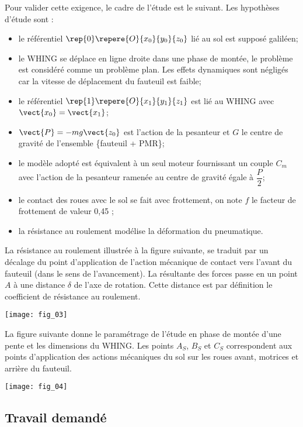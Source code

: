 Pour valider cette exigence, le cadre de l'étude est le suivant.
Les hypothèses d'étude sont :
\begin{itemize}
\item le référentiel $\rep{0}\repere{O}{x_0}{y_0}{z_0}$ lié au sol est supposé galiléen;
\item le WHING se déplace en ligne droite dans une phase de montée, le problème est considéré comme un problème plan. Les effets dynamiques sont négligés car la vitesse de déplacement du
fauteuil est faible;
\item le référentiel $\rep{1}\repere{O}{x_1}{y_1}{z_1}$ est lié au WHING avec $\vect{x_0}=\vect{x_1}$;
\item $\vect{P}=-mg\vect{z_0}$ est l'action de la pesanteur et $G$ le centre de gravité de l'ensemble \{fauteuil +
PMR\};
\item le modèle adopté est équivalent à un seul moteur fournissant un couple $C_m$ avec l'action de la
pesanteur ramenée au centre de gravité égale à $\dfrac{P}{2}$;
\item le contact des roues avec le sol se fait avec frottement, on note $f$ le facteur de frottement de valeur 0,45 ;
\item la résistance au roulement modélise la déformation du pneumatique.
\end{itemize}

La résistance au roulement illustrée à la figure suivante, se traduit par un décalage du point
d'application de l'action mécanique de contact vers l'avant du fauteuil (dans le sens de l'avancement). La résultante des forces passe en un point $A$ à une distance $\delta$ de l'axe de rotation.
Cette distance est par définition le coefficient de résistance au roulement.


\begin{center}
\texttt{[image: fig\_03]}
\end{center}


La figure suivante donne le paramétrage de l'étude en phase de montée d'une pente et les dimensions du WHING. Les points $A_S$, $B_S$ et $C_S$  correspondent aux points d'application des actions mécaniques du sol sur les roues avant, motrices et arrière du fauteuil.


\begin{center}
\texttt{[image: fig\_04]}
\end{center}

\subsection*{Travail demandé}


